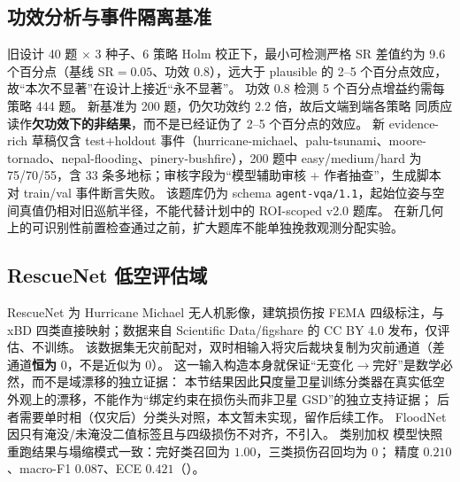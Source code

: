 \subsection{功效分析与事件隔离基准}
\label{sec:x4x5}
旧设计 40 题 $\times$ 3 种子、6 策略 Holm 校正下，最小可检测严格 SR 差值约为 9.6 个百分点（基线 SR$=0.05$、功效 $0.8$），远大于 plausible 的 2--5 个百分点效应，故``本次不显著''在设计上接近``永不显著''。
功效 0.8 检测 5 个百分点增益约需每策略 444 题。
新基准为 200 题，仍欠功效约 $2.2$ 倍，故后文端到端各策略 \SR 同质应读作\textbf{欠功效下的非结果}，而不是已经证伪了 2--5 个百分点的效应。
新 evidence-rich 草稿仅含 test+holdout 事件（hurricane-michael、palu-tsunami、moore-tornado、nepal-flooding、pinery-bushfire），200 题中 easy/medium/hard 为 75/70/55，含 33 条多地标；审核字段为``模型辅助审核 + 作者抽查''，生成脚本对 train/val 事件断言失败。
该题库仍为 schema \texttt{agent-vqa/1.1}，起始位姿与空间真值仍相对旧巡航半径，不能代替计划中的 ROI-scoped v2.0 题库。
在新几何上的可识别性前置检查通过之前，扩大题库不能单独挽救观测分配实验。

\begin{table}[htbp]
\centering
\caption{六策略 Holm 校正下的样本量规划。表中 0.0962 是相对基线 \SR 的最小可检测差值，不是成功率本身。}
\label{tab:power}

\end{table}

\subsection{RescueNet 低空评估域}
\label{sec:rescuenet}
RescueNet 为 Hurricane Michael 无人机影像，建筑损伤按 FEMA 四级标注，与 xBD 四类直接映射\cite{rahnemoonfar2023rescuenet}；数据来自 Scientific Data/figshare 的 CC BY 4.0 发布，仅评估、不训练。
该数据集无灾前配对，双时相输入将灾后裁块复制为灾前通道（差通道\textbf{恒为} 0，不是近似为 0）。
这一输入构造本身就保证``无变化$\to$完好''是数学必然，而不是域漂移的独立证据：
本节结果因此\textbf{只}度量卫星训练分类器在真实低空外观上的漂移，不能作为``绑定约束在损伤头而非卫星 GSD''的独立支持证据；
后者需要单时相（仅灾后）分类头对照，本文暂未实现，留作后续工作。
FloodNet 因只有淹没/未淹没二值标签且与四级损伤不对齐，不引入。
类别加权 模型快照 重跑结果与塌缩模式一致：完好类召回为 $1.00$，三类损伤召回均为 0；
精度 $0.210$、macro-F1 $0.087$、ECE $0.421$（）。

\begin{table}[htbp]
\centering
\caption{卫星训练分类器在 RescueNet 测试影像上的零样本漂移（灾后裁块复制为灾前）。}
\label{tab:rescue}

\end{table}

